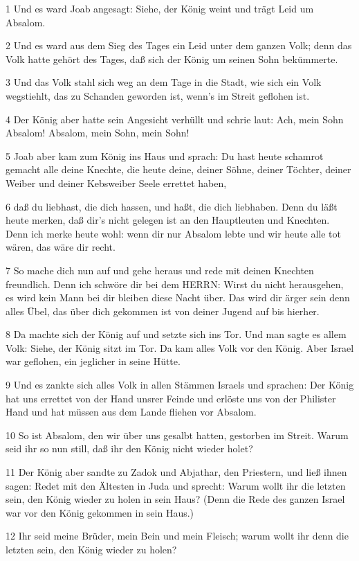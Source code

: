 \par 1 Und es ward Joab angesagt: Siehe, der König weint und trägt Leid um Absalom.
\par 2 Und es ward aus dem Sieg des Tages ein Leid unter dem ganzen Volk; denn das Volk hatte gehört des Tages, daß sich der König um seinen Sohn bekümmerte.
\par 3 Und das Volk stahl sich weg an dem Tage in die Stadt, wie sich ein Volk wegstiehlt, das zu Schanden geworden ist, wenn's im Streit geflohen ist.
\par 4 Der König aber hatte sein Angesicht verhüllt und schrie laut: Ach, mein Sohn Absalom! Absalom, mein Sohn, mein Sohn!
\par 5 Joab aber kam zum König ins Haus und sprach: Du hast heute schamrot gemacht alle deine Knechte, die heute deine, deiner Söhne, deiner Töchter, deiner Weiber und deiner Kebsweiber Seele errettet haben,
\par 6 daß du liebhast, die dich hassen, und haßt, die dich liebhaben. Denn du läßt heute merken, daß dir's nicht gelegen ist an den Hauptleuten und Knechten. Denn ich merke heute wohl: wenn dir nur Absalom lebte und wir heute alle tot wären, das wäre dir recht.
\par 7 So mache dich nun auf und gehe heraus und rede mit deinen Knechten freundlich. Denn ich schwöre dir bei dem HERRN: Wirst du nicht herausgehen, es wird kein Mann bei dir bleiben diese Nacht über. Das wird dir ärger sein denn alles Übel, das über dich gekommen ist von deiner Jugend auf bis hierher.
\par 8 Da machte sich der König auf und setzte sich ins Tor. Und man sagte es allem Volk: Siehe, der König sitzt im Tor. Da kam alles Volk vor den König. Aber Israel war geflohen, ein jeglicher in seine Hütte.
\par 9 Und es zankte sich alles Volk in allen Stämmen Israels und sprachen: Der König hat uns errettet von der Hand unsrer Feinde und erlöste uns von der Philister Hand und hat müssen aus dem Lande fliehen vor Absalom.
\par 10 So ist Absalom, den wir über uns gesalbt hatten, gestorben im Streit. Warum seid ihr so nun still, daß ihr den König nicht wieder holet?
\par 11 Der König aber sandte zu Zadok und Abjathar, den Priestern, und ließ ihnen sagen: Redet mit den Ältesten in Juda und sprecht: Warum wollt ihr die letzten sein, den König wieder zu holen in sein Haus? (Denn die Rede des ganzen Israel war vor den König gekommen in sein Haus.)
\par 12 Ihr seid meine Brüder, mein Bein und mein Fleisch; warum wollt ihr denn die letzten sein, den König wieder zu holen?
